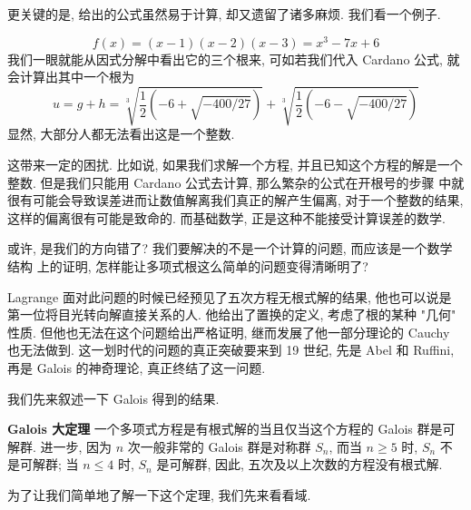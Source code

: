 \documentclass[UTF8]{book}
\begin{document}
更关键的是, 给出的公式虽然易于计算, 却又遗留了诸多麻烦. 我们看一个例子. 

$$ f(x) = (x-1)(x-2)(x-3) = x^3 - 7x +6 $$
我们一眼就能从因式分解中看出它的三个根来, 可如若我们代入 Cardano 公式, 
就会计算出其中一个根为 
$$ u = g+h = \sqrt[3]{\frac{1}{2}(-6+\sqrt{-400/27})}
+ \sqrt[3]{\frac{1}{2}(-6-\sqrt{-400/27})} $$
显然, 大部分人都无法看出这是一个整数. 

这带来一定的困扰. 比如说, 如果我们求解一个方程, 并且已知这个方程的解是一个
整数. 但是我们只能用 Cardano 公式去计算, 那么繁杂的公式在开根号的步骤
中就很有可能会导致误差进而让数值解离我们真正的解产生偏离, 对于一个整数的结果, 
这样的偏离很有可能是致命的. 而基础数学, 正是这种不能接受计算误差的数学. 

或许, 是我们的方向错了? 我们要解决的不是一个计算的问题, 而应该是一个数学结构
上的证明, 怎样能让多项式根这么简单的问题变得清晰明了? 

Lagrange 面对此问题的时候已经预见了五次方程无根式解的结果, 他也可以说是
第一位将目光转向解直接关系的人. 他给出了置换的定义, 考虑了根的某种 "几何" 
性质. 但他也无法在这个问题给出严格证明, 继而发展了他一部分理论的 Cauchy 
也无法做到. 这一划时代的问题的真正突破要来到 19 世纪, 先是 Abel 和 Ruffini, 
再是 Galois 的神奇理论, 真正终结了这一问题. 

我们先来叙述一下 Galois 得到的结果. 

\begin{theorem}
    \textbf{Galois 大定理} 一个多项式方程是有根式解的当且仅当这个方程的 
    Galois 群是可解群. 
    进一步, 因为 $n$ 次一般非常的 Galois 群是对称群 $S_n$, 
    而当 $n\geq 5$ 时, $S_n$ 不是可解群; 当 $n\leq 4$ 时, $S_n$ 是可解群, 
    因此, 五次及以上次数的方程没有根式解. 
\end{theorem}

为了让我们简单地了解一下这个定理, 我们先来看看域. 
\end{document}
